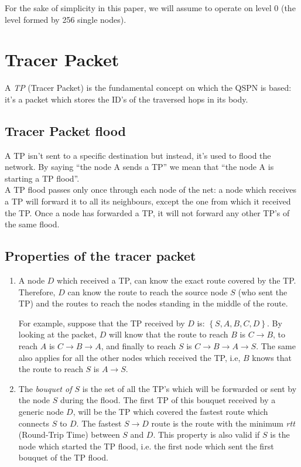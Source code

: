 \documentclass[a4paper]{article}
\begin{document}
For the sake of simplicity in this paper, we will assume to operate on level
0 (the level formed by 256 single nodes).

\section{Tracer Packet}
\label{sec:TP}

A \emph{TP} (Tracer Packet) is the fundamental concept on which the QSPN is
based: it's a packet which stores the ID's of the traversed hops in its body.

\subsection{Tracer Packet flood}
\label{sec:TP_flood}

A TP isn't sent to a specific destination but instead, it's used to flood the
network. By saying ``the node A sends a TP'' we mean that ``the node A is
starting a TP flood''.\\

A TP flood passes only once through each node of the net: a node which
receives a TP will forward it to all its neighbours, except the one from which
it received the TP. Once a node has forwarded a TP, it will not forward any
other TP's of the same flood.

\subsection{Properties of the tracer packet}
\label{sec:proprieties_TP}

\begin{enumerate}
	\item A node $D$ which received a TP, can know the exact route covered
		by the TP. Therefore, $D$ can know the route to reach the
		source node $S$ (who sent the TP) and the routes to reach
		the nodes standing in the middle of the route.

		For example, suppose that the TP received by $D$ is: $\left\{
		S, A, B, C, D \right\}$. By looking at the packet, $D$ will
		know that the route to reach $B$ is $C\rightarrow B$, to reach $A$ is
		$C\rightarrow B\rightarrow A$, and finally to reach $S$ is
		$C\rightarrow B\rightarrow A\rightarrow S$.
		The same also applies for all the other nodes which received
		the TP, i.e, $B$ knows that the route to reach $S$ is
		$A\rightarrow S$.
	\item The \emph{bouquet of $S$} is the set of all the TP's which will
		be forwarded or sent by the node $S$ during the flood.
		The first TP of this bouquet received by a generic node $D$,
		will be the TP which covered the fastest route which connects
		$S$ to $D$.
		The fastest $S \rightarrow D$ route is the route with the
		minimum \emph{rtt} (Round-Trip Time) between $S$ and $D$.
		This property is also valid if $S$ is the node which started
		the TP flood, i.e. the first node which sent the first bouquet
		of the TP flood.
\end{enumerate}
\end{document}

